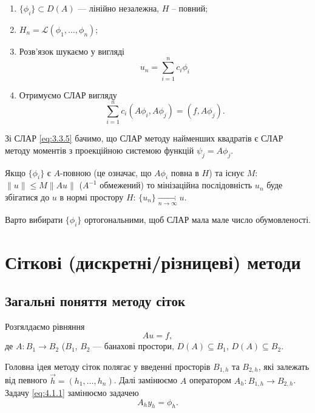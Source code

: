 \begin{enumerate}
    \item $\{\phi_i\} \subset D(A)$ --- лінійно незалежна, $H$ -- повний;
    \item $H_n = \mathcal{L}(\phi_1, \ldots, \phi_n)$;
    \item Розв'язок шукаємо у вигляді
    \begin{equation}
        \label{eq:3.3.4}
        u_n = \sum_{i = 1}^n c_i \phi_i
    \end{equation}
    \item Отримуємо СЛАР вигляду
    \begin{equation}
        \label{eq:3.3.5}
        \sum_{i = 1}^n c_i (A \phi_i, A \phi_j) = (f, A \phi_j).
    \end{equation}
\end{enumerate}

Зі СЛАР \eqref{eq:3.3.5} бачимо, що СЛАР методу найменших квадратів є СЛАР методу моментів з проекційною системою функцій $\psi_j = A \phi_j$.

\begin{theorem}
    Якщо $\{\phi_i\}$ є $A$-повною (це означає, що $A \phi_i$ повна в $H$) та існує $M$: $\|u\| \le M \|A u\|$ 
    ($A^{-1}$ обмежений) то мінізаційна послідовність $u_n$ буде збігатися до $u$ в нормі простору $H$: 
    $\{u_n\} \xrightarrow[n \to \infty]{} u$.
\end{theorem}

\begin{remark}
    Варто вибирати $\{\phi_i\}$ ортогональними, щоб СЛАР мала мале число обумовленості.
\end{remark}

\section{Сіткові (дискретні/різницеві) методи}

\subsection{Загальні поняття методу сіток}

Розгялдаємо рівняння
\begin{equation}
    \label{eq:4.1.1}
    A u = f,
\end{equation}
де $A: B_1 \to B_2$ ($B_1$, $B_2$ --- банахові простори, $D(A) \subseteq B_1$, $D(A) \subseteq B_2$. \medskip

Головна ідея методу сіток полягає у введенні просторів $B_{1,h}$ та $B_{2,h}$, 
які залежать від певного $\vec h = (h_1, \ldots, h_n)$. 
Далі замінюємо $A$ оператором $A_h: B_{1,h} \to B_{2,h}$. Задачу \eqref{eq:4.1.1} замінюємо задачею
\begin{equation}
    \label{eq:4.1.2}
    A_h y_h = \phi_h.
\end{equation}

